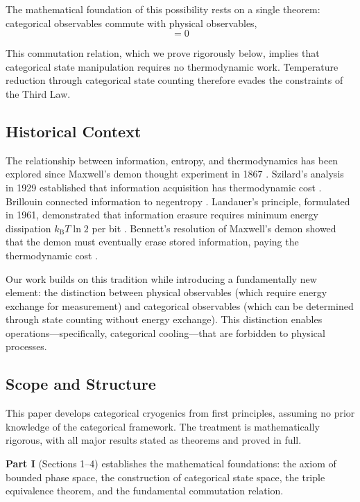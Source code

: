 \documentclass[twocolumn,10pt,twoside]{article}
\newcommand{\kb}{k_{\mathrm{B}}}
\newcommand{\Ocat}{\hat{O}_{\mathrm{cat}}}
\newcommand{\Ophys}{\hat{O}_{\mathrm{phys}}}
\begin{document}
The mathematical foundation of this possibility rests on a single theorem: categorical observables commute with physical observables,
\begin{equation}
[\Ocat, \Ophys] = 0
\label{eq:commutation_intro}
\end{equation}

This commutation relation, which we prove rigorously below, implies that categorical state manipulation requires no thermodynamic work. Temperature reduction through categorical state counting therefore evades the constraints of the Third Law.

\subsection{Historical Context}

The relationship between information, entropy, and thermodynamics has been explored since Maxwell's demon thought experiment in 1867 \cite{maxwell1867}. Szilard's analysis in 1929 established that information acquisition has thermodynamic cost \cite{szilard1929}. Brillouin connected information to negentropy \cite{brillouin1951}. Landauer's principle, formulated in 1961, demonstrated that information erasure requires minimum energy dissipation $\kb T \ln 2$ per bit \cite{landauer1961}. Bennett's resolution of Maxwell's demon showed that the demon must eventually erase stored information, paying the thermodynamic cost \cite{bennett1982,bennett2003}.

Our work builds on this tradition while introducing a fundamentally new element: the distinction between physical observables (which require energy exchange for measurement) and categorical observables (which can be determined through state counting without energy exchange). This distinction enables operations---specifically, categorical cooling---that are forbidden to physical processes.

\subsection{Scope and Structure}

This paper develops categorical cryogenics from first principles, assuming no prior knowledge of the categorical framework. The treatment is mathematically rigorous, with all major results stated as theorems and proved in full.

\textbf{Part I} (Sections 1--4) establishes the mathematical foundations: the axiom of bounded phase space, the construction of categorical state space, the triple equivalence theorem, and the fundamental commutation relation.
\end{document}
